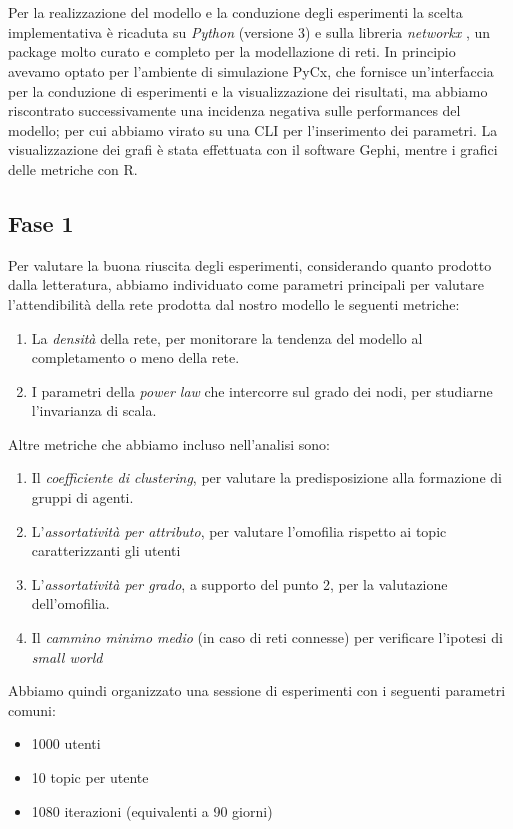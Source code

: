 \documentclass[a4paper,12pt]{article}
\begin{document}
\\
\\
Per la realizzazione del modello e la conduzione degli esperimenti la scelta implementativa è ricaduta su \textit{Python} (versione 3) e sulla libreria \textit{networkx} \cite{nx}, un package molto curato e completo per la modellazione di reti. In principio avevamo optato per l'ambiente di simulazione PyCx, che fornisce un'interfaccia per la conduzione di esperimenti e la visualizzazione dei risultati, ma abbiamo riscontrato successivamente una incidenza negativa sulle performances del modello; per cui abbiamo virato su una CLI per l'inserimento dei parametri. La visualizzazione dei grafi è stata effettuata con il software Gephi, mentre i grafici delle metriche con R.
\subsection{Fase 1}
Per valutare la buona riuscita degli esperimenti, considerando quanto prodotto dalla letteratura, abbiamo individuato come parametri principali per valutare l'attendibilità della rete prodotta dal nostro modello le seguenti metriche:
\begin{enumerate}
    \item La \textit{densità} della rete, per monitorare la tendenza del modello al completamento o meno della rete.
    \item I parametri della \textit{power law} che intercorre sul grado dei nodi, per studiarne l'invarianza di scala.
\end{enumerate}
Altre metriche che abbiamo incluso nell'analisi sono:
\begin{enumerate}
    \item Il \textit{coefficiente di clustering}, per valutare la predisposizione alla formazione di gruppi di agenti.
    \item L'\textit{assortatività per attributo}, per valutare l'omofilia rispetto ai topic caratterizzanti gli utenti
    \item L'\textit{assortatività per grado}, a supporto del punto 2, per la valutazione dell'omofilia.
    \item Il \textit{cammino minimo medio} (in caso di reti connesse) per verificare l'ipotesi di \textit{small world}
\end{enumerate}
Abbiamo quindi organizzato una sessione di esperimenti con i seguenti parametri comuni:
\begin{itemize}
\item 1000 utenti
\item 10 topic per utente
\item 1080 iterazioni (equivalenti a 90 giorni)
\end{itemize}
\end{document}
